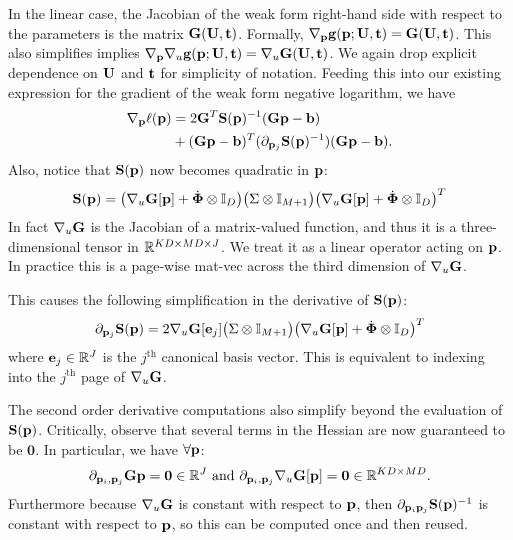 In the linear case, the Jacobian of the weak form right-hand side with respect to the parameters is the matrix $\mathbf{G}(\mathbf{U}, \mathbf{t})$. Formally, $\nabla_{\mathbf{p}} \mathbf{g}(\mathbf{p}; \mathbf{U}, \mathbf{t}) = \mathbf{G}(\mathbf{U},\mathbf{t})$. This also simplifies implies $\nabla_{\mathbf{p}} \nabla_{u} \mathbf{g}(\mathbf{p}; \mathbf{U}, \mathbf{t}) = \nabla_{u} \mathbf{G}(\mathbf{U}, \mathbf{t})$. We again drop explicit dependence on $\mathbf{U}$ and $\mathbf{t}$ for simplicity of notation. Feeding this into our existing expression for the gradient of the weak form negative logarithm, we have
\begin{align*}
	\nabla_{\mathbf{p}} \ell(\mathbf{p}) &= 2 \mathbf{G}^T \mathbf{S}(\mathbf{p})^{-1} (\mathbf{G}\mathbf{p}- \mathbf{b}) \\
	&+ (\mathbf{G}\mathbf{p}-\mathbf{b})^T(\partial_{\mathbf{p}_j} \mathbf{S}(\mathbf{p})^{-1})(\mathbf{G}\mathbf{p}-\mathbf{b}).
\end{align*}
Also, notice that $\mathbf{S}(\mathbf{p})$ now becomes quadratic in $\mathbf{p}$:
\[\mathbf{S}(\mathbf{p}) = \bigl(\nabla_{u} \mathbf{G} [\mathbf{p}]+\dot{\boldsymbol{\Phi}} \otimes \mathbb{I}_D\bigr) \bigl(\Sigma \otimes \mathbb{I}_{M+1} \bigr)\bigl(\nabla_{u} \mathbf{G} [\mathbf{p}] + \dot{\boldsymbol{\Phi}} \otimes \mathbb{I}_D\bigr)^T \]
In fact $\nabla_{u} \mathbf{G}$ is the Jacobian of a matrix-valued function, and thus it is a three-dimensional tensor in $\mathbb{R}^{KD \times MD \times J}$. We treat it  as a linear operator acting on $\mathbf{p}$.  In practice this is a page-wise mat-vec across the third dimension of $\nabla_{u} \mathbf{G}$. 

This causes the following simplification in the derivative of $\mathbf{S}(\mathbf{p})$:
\[\partial_{\mathbf{p}_j} \mathbf{S}(\mathbf{p}) = 2\nabla_{u} \mathbf{G} [\mathbf{e}_j] \bigl(\Sigma \otimes \mathbb{I}_{M+1} \bigr) \bigl(\nabla_{u}\mathbf{G}[\mathbf{p}]+\dot{\boldsymbol{\Phi}} \otimes \mathbb{I}_D\bigr)^T \]
where $\mathbf{e}_j \in \mathbb{R}^J$ is the $j^\text{th}$ canonical basis vector. This is equivalent to indexing into the $j^\text{th}$ page of $\nabla_{u}\mathbf{G}$. 

The second order derivative computations also simplify beyond the evaluation of $\mathbf{S}(\mathbf{p})$. Critically, observe that several terms in the Hessian are now guaranteed to be $\mathbf{0}$. In particular, we have $\forall \mathbf{p}$:
\[\partial_{\mathbf{p}_i,\mathbf{p}_j} \mathbf{G} \mathbf{p} = \mathbf{0} \in \mathbb{R}^J \text{ and }  
\partial_{\mathbf{p}_i,\mathbf{p}_j} \nabla_{u} \mathbf{G}[\mathbf{p}] = \mathbf{0} \in \mathbb{R}^{KD\times MD}. \]
Furthermore because $\nabla_{u} \mathbf{G}$ is constant with respect to $\mathbf{p}$, then $\partial_{\mathbf{p}_i \mathbf{p}_j}\mathbf{S}(\mathbf{p})^{-1}$ is constant with respect to $\mathbf{p}$, so this can be computed once and then reused. 

